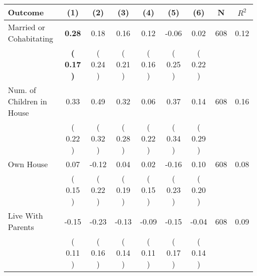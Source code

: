 \begin{tabular}{lcccccccc}
\toprule
 \textbf{Outcome} & \textbf{(1)} & \textbf{(2)} & \textbf{(3)} & \textbf{(4)} & \textbf{(5)} & \textbf{(6)} & \textbf{N} & \textbf{$ R^2$} \\
\midrule
Married or Cohabitating & \textbf{     0.28} &      0.18 &      0.16 &      0.12 &     -0.06 &      0.02 & 608 &       0.12 \\ 
 & \textbf{(     0.17 )} & (     0.24 ) & (     0.21 ) & (     0.16 ) & (     0.25 ) & (     0.22 ) & \\
Num. of Children in House &      0.33 &      0.49 &      0.32 &      0.06 &      0.37 &      0.14 & 608 &       0.16 \\ 
 & (     0.22 ) & (     0.32 ) & (     0.28 ) & (     0.22 ) & (     0.34 ) & (     0.29 ) & \\
Own House &      0.07 &     -0.12 &      0.04 &      0.02 &     -0.16 &      0.10 & 608 &       0.08 \\ 
 & (     0.15 ) & (     0.22 ) & (     0.19 ) & (     0.15 ) & (     0.23 ) & (     0.20 ) & \\
Live With Parents &     -0.15 &     -0.23 &     -0.13 &     -0.09 &     -0.15 &     -0.04 & 608 &       0.09 \\ 
 & (     0.11 ) & (     0.16 ) & (     0.14 ) & (     0.11 ) & (     0.17 ) & (     0.14 ) & \\
\bottomrule
\end{tabular}
